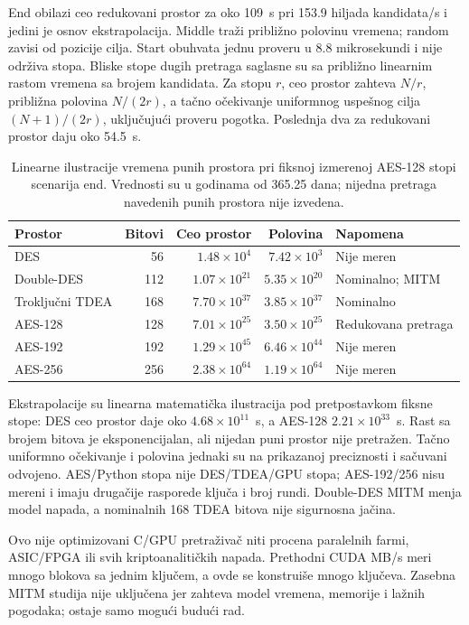 End obilazi ceo redukovani prostor za oko 109~s pri 153.9 hiljada
kandidata/s i jedini je osnov ekstrapolacija. Middle traži približno
polovinu vremena; random zavisi od pozicije cilja. Start obuhvata jednu
proveru u 8.8 mikrosekundi i nije održiva stopa. Bliske stope dugih
pretraga saglasne su sa približno linearnim rastom vremena sa brojem
kandidata. Za stopu $r$, ceo prostor zahteva $N/r$, približna polovina
$N/(2r)$, a tačno očekivanje uniformnog uspešnog cilja $(N+1)/(2r)$,
uključujući proveru pogotka. Poslednja dva za redukovani prostor daju oko 54.5~s.

\begin{table}[htbp]
\centering
\small
\caption{Linearne ilustracije vremena punih prostora pri fiksnoj
izmerenoj AES-128 stopi scenarija end. Vrednosti su u godinama od
365.25 dana; nijedna pretraga navedenih punih prostora nije izvedena.}
\label{tab:brute-force-extrapolations}
\begin{tabular}{lrrrl}
\toprule
Prostor & Bitovi & Ceo prostor & Polovina & Napomena \\
\midrule
DES & 56 & $1.48\times10^{4}$ & $7.42\times10^{3}$ & Nije meren \\
Double-DES & 112 & $1.07\times10^{21}$ & $5.35\times10^{20}$ & Nominalno; MITM \\
Troključni TDEA & 168 & $7.70\times10^{37}$ & $3.85\times10^{37}$ & Nominalno \\
AES-128 & 128 & $7.01\times10^{25}$ & $3.50\times10^{25}$ & Redukovana pretraga \\
AES-192 & 192 & $1.29\times10^{45}$ & $6.46\times10^{44}$ & Nije meren \\
AES-256 & 256 & $2.38\times10^{64}$ & $1.19\times10^{64}$ & Nije meren \\
\bottomrule
\end{tabular}
\end{table}

Ekstrapolacije su linearna matematička ilustracija pod pretpostavkom
fiksne stope: DES ceo prostor daje oko $4.68\times10^{11}$~s, a
AES-128 $2.21\times10^{33}$~s. Rast sa brojem bitova je eksponencijalan,
ali nijedan puni prostor nije pretražen. Tačno uniformno očekivanje i
polovina jednaki su na prikazanoj preciznosti i sačuvani odvojeno.
AES/Python stopa nije DES/TDEA/GPU stopa; AES-192/256 nisu mereni i
imaju drugačije rasporede ključa i broj rundi. Double-DES MITM menja
model napada, a nominalnih 168 TDEA bitova nije sigurnosna jačina.

Ovo nije optimizovani C/GPU pretraživač niti procena paralelnih farmi,
ASIC/FPGA ili svih kriptoanalitičkih napada. Prethodni CUDA MB/s meri
mnogo blokova sa jednim ključem, a ovde se konstruiše mnogo ključeva.
Zasebna MITM studija nije uključena jer zahteva model vremena, memorije
i lažnih pogodaka; ostaje samo mogući budući rad.

